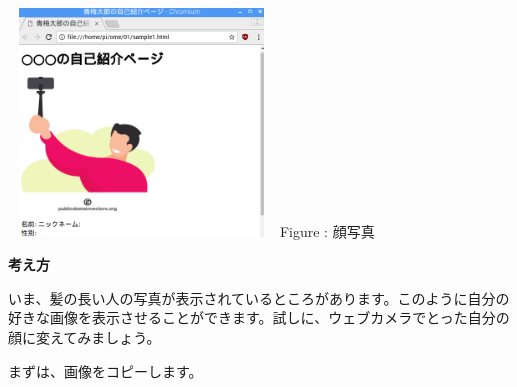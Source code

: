 \documentclass[a4paper,12pt]{jarticle}
\begin{document}
\centering
\begin{minipage}{6.738cm}
  {\upshape
    \includegraphics[width=7.071cm,height=6.048cm]{textbook-img161.png}
    \newline
    Figure : 顔写真}
\end{minipage}

\flushleft
\textbf{考え方}


いま、髪の長い人の写真が表示されているところがあります。このように自分の好きな画像を表示させることができます。試しに、ウェブカメラでとった自分の顔に変えてみましょう。

まずは、画像をコピーします。


\bigskip
\end{document}
